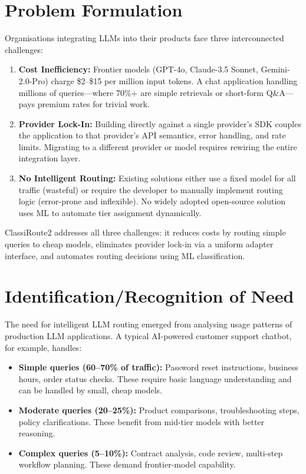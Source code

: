 \documentclass[12pt,a4paper]{report}
\begin{document}
\section{Problem Formulation}

Organisations integrating LLMs into their products face three interconnected challenges:

\begin{enumerate}[nosep]
    \item \textbf{Cost Inefficiency:} Frontier models (GPT-4o, Claude-3.5 Sonnet, Gemini-2.0-Pro) charge \$2--\$15 per million input tokens. A chat application handling millions of queries---where 70\%+ are simple retrievals or short-form Q\&A---pays premium rates for trivial work.
    \item \textbf{Provider Lock-In:} Building directly against a single provider's SDK couples the application to that provider's API semantics, error handling, and rate limits. Migrating to a different provider or model requires rewiring the entire integration layer.
    \item \textbf{No Intelligent Routing:} Existing solutions either use a fixed model for all traffic (wasteful) or require the developer to manually implement routing logic (error-prone and inflexible). No widely adopted open-source solution uses ML to automate tier assignment dynamically.
\end{enumerate}

ClassiRoute2 addresses all three challenges: it reduces costs by routing simple queries to cheap models, eliminates provider lock-in via a uniform adapter interface, and automates routing decisions using ML classification.

\section{Identification/Recognition of Need}

The need for intelligent LLM routing emerged from analysing usage patterns of production LLM applications. A typical AI-powered customer support chatbot, for example, handles:

\begin{itemize}[nosep]
    \item \textbf{Simple queries (60--70\% of traffic):} Password reset instructions, business hours, order status checks. These require basic language understanding and can be handled by small, cheap models.
    \item \textbf{Moderate queries (20--25\%):} Product comparisons, troubleshooting steps, policy clarifications. These benefit from mid-tier models with better reasoning.
    \item \textbf{Complex queries (5--10\%):} Contract analysis, code review, multi-step workflow planning. These demand frontier-model capability.
\end{itemize}
\end{document}
